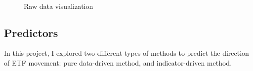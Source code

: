 \documentclass[letterpaper]{article}
\begin{document}
\begin{figure}
     \\
    \caption{Raw data visualization}
  \label{plotRawData}
\end{figure}

\subsection{Predictors}
In this project, I explored two different types of methods to predict the
direction of ETF movement: pure data-driven method, and
indicator-driven method.
\end{document}
